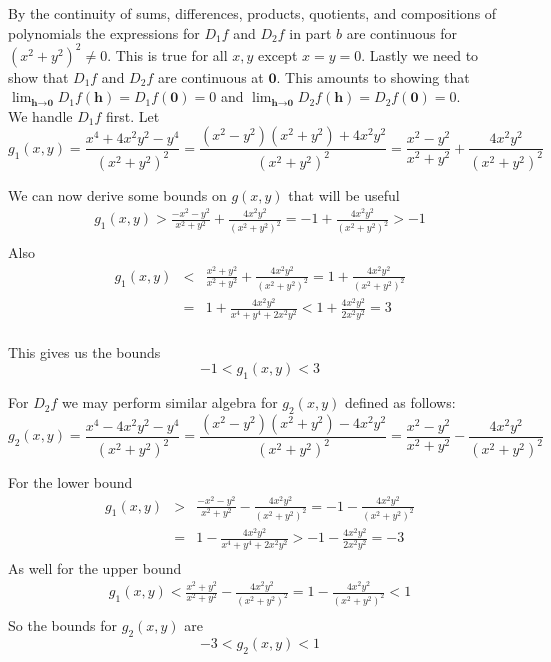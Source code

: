 \documentclass[11pt,reqno]{article}
\begin{document}
By the continuity of sums, differences, products, quotients, and compositions of polynomials the expressions for $D_1 f$ and $D_2 f$ in part $b$ are continuous for $(x^2 + y^2)^2 \neq 0$. This is true for all $x,y$ except $x = y = 0$. Lastly we need to show that $D_1 f$ and $D_2 f$ are continuous at $\textbf{0}$. This amounts to showing that $\lim_{ \textbf{h} \to \textbf{0}} D_1 f(\textbf{h}) = D_1 f(\textbf{0}) = 0$ and  $\lim_{ \textbf{h} \to \textbf{0}} D_2 f(\textbf{h}) = D_2 f(\textbf{0}) = 0$.\\
\noindent We handle $D_1 f$ first. Let 
\[ g_1(x,y) =  \frac{x^4 + 4 x^2 y^2 - y^4}{(x^2 + y^2)^2} = \frac{(x^2-y^2)(x^2 + y^2) + 4 x^2 y^2}{(x^2 + y^2)^2} =  \frac{x^2-y^2}{x^2 + y^2}  + \frac{4 x^2 y^2}{(x^2 + y^2)^2} \]

\noindent We can now derive some bounds on $g(x,y)$ that will be useful
\begin{eqnarray*}
g_1(x,y) > \frac{-x^2-y^2}{x^2 + y^2}  + \frac{4 x^2 y^2}{(x^2 + y^2)^2} = -1 + \frac{4 x^2 y^2}{(x^2 + y^2)^2} >  -1\\
\end{eqnarray*}
\noindent Also
\begin{eqnarray*}
g_1(x,y) &<& \frac{x^2 + y^2}{x^2 + y^2}  + \frac{4 x^2 y^2}{(x^2 + y^2)^2} = 1 + \frac{4 x^2 y^2}{(x^2 + y^2)^2}\\
&=& 1 + \frac{4 x^2 y^2}{x^4 + y^4 + 2 x^2 y^2} < 1 + \frac{4 x^2 y^2}{2 x^2 y^2} = 3 \\
\end{eqnarray*}

\noindent This gives us the bounds
\[ -1 < g_1(x,y) < 3 \]

\noindent For $D_2 f$ we may perform similar algebra for $g_2(x,y)$ defined as follows:
\[ g_2(x,y) =  \frac{x^4 - 4 x^2 y^2 - y^4}{(x^2 + y^2)^2} = \frac{(x^2-y^2)(x^2 + y^2) - 4 x^2 y^2}{(x^2 + y^2)^2} =  \frac{x^2-y^2}{x^2 + y^2}  - \frac{4 x^2 y^2}{(x^2 + y^2)^2} \]

\noindent For the lower bound
\begin{eqnarray*}
g_1(x,y) &>& \frac{-x^2 - y^2}{x^2 + y^2}  - \frac{4 x^2 y^2}{(x^2 + y^2)^2} = -1 - \frac{4 x^2 y^2}{(x^2 + y^2)^2}\\
&=& 1 - \frac{4 x^2 y^2}{x^4 + y^4 + 2 x^2 y^2} > -1 - \frac{4 x^2 y^2}{2 x^2 y^2} = -3 \\
\end{eqnarray*}
\noindent As well for the upper bound
\begin{eqnarray*}
g_1(x,y) < \frac{x^2+y^2}{x^2 + y^2}  - \frac{4 x^2 y^2}{(x^2 + y^2)^2} = 1 - \frac{4 x^2 y^2}{(x^2 + y^2)^2} < 1\\
\end{eqnarray*}
\noindent So the bounds for $g_2(x,y)$ are
\[ -3 < g_2(x,y) < 1 \] 
\end{document}
